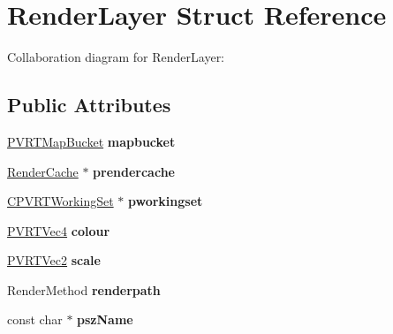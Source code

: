 \hypertarget{struct_render_layer}{\section{Render\+Layer Struct Reference}
\label{struct_render_layer}
}


Collaboration diagram for Render\+Layer\+:
\subsection*{Public Attributes}
\begin{DoxyCompactItemize}
\item 
\hypertarget{struct_render_layer_a174ce7d7cde9d5e8bafa0576d928e61c}{\hyperlink{struct_p_v_r_t_map_bucket}{P\+V\+R\+T\+Map\+Bucket} {\bfseries mapbucket}}\label{struct_render_layer_a174ce7d7cde9d5e8bafa0576d928e61c}

\item 
\hypertarget{struct_render_layer_a24039d20ea3f2cd6e1eab38c62cc1f7a}{\hyperlink{struct_render_cache}{Render\+Cache} $\ast$ {\bfseries prendercache}}\label{struct_render_layer_a24039d20ea3f2cd6e1eab38c62cc1f7a}

\item 
\hypertarget{struct_render_layer_a4d867bf588cd9580c2f689ffc188eecf}{\hyperlink{class_c_p_v_r_t_working_set}{C\+P\+V\+R\+T\+Working\+Set} $\ast$ {\bfseries pworkingset}}\label{struct_render_layer_a4d867bf588cd9580c2f689ffc188eecf}

\item 
\hypertarget{struct_render_layer_a552d38623e4375959076b45e443e984b}{\hyperlink{struct_p_v_r_t_vec4}{P\+V\+R\+T\+Vec4} {\bfseries colour}}\label{struct_render_layer_a552d38623e4375959076b45e443e984b}

\item 
\hypertarget{struct_render_layer_a07002b95c2863375040cebf630199272}{\hyperlink{struct_p_v_r_t_vec2}{P\+V\+R\+T\+Vec2} {\bfseries scale}}\label{struct_render_layer_a07002b95c2863375040cebf630199272}

\item 
\hypertarget{struct_render_layer_a8425d72fe20764317a8564ec5f707189}{Render\+Method {\bfseries renderpath}}\label{struct_render_layer_a8425d72fe20764317a8564ec5f707189}

\item 
\hypertarget{struct_render_layer_ab778af9f96151c17ca973b3f1ae19f88}{const char $\ast$ {\bfseries psz\+Name}}\label{struct_render_layer_ab778af9f96151c17ca973b3f1ae19f88}

\end{DoxyCompactItemize}



